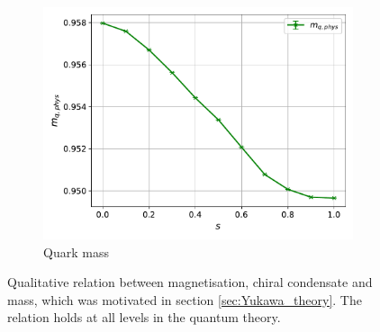 \begin{figure}
\begin{subfigure}[b]{0.45\textwidth}
        \includegraphics[width=\textwidth]{figures/slide_broken/mass.pdf}
        \caption{Quark mass}
    \end{subfigure}
    \caption[Relation between magnetisation, condensate and mass]{Qualitative relation between magnetisation, chiral condensate and mass, which was motivated in section \ref{sec:Yukawa_theory}. The relation holds at all levels in the quantum theory.}
    \label{fig:interpolation_relation_phi_cond_mass}
\end{figure}
\newpage

